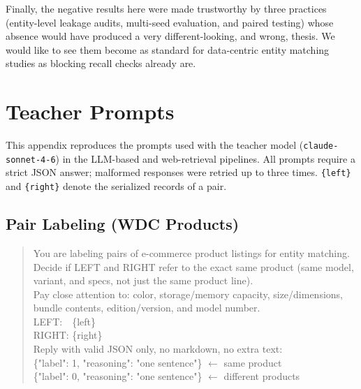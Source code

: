 \documentclass[a4paper,oneside,bibliography=totoc]{scrbook}
\begin{document}
Finally, the negative results here were made trustworthy by three practices (entity-level leakage audits, multi-seed evaluation, and paired testing) whose absence would have produced a very different-looking, and wrong, thesis. We would like to see them become as standard for data-centric entity matching studies as blocking recall checks already are.




\appendix

\chapter{Teacher Prompts}
\label{app:prompts}

{\sloppy This appendix reproduces the prompts used with the teacher model (\texttt{claude-sonnet-4-6}) in the LLM-based and web-retrieval pipelines. All prompts require a strict JSON answer; malformed responses were retried up to three times. \texttt{\{left\}} and \texttt{\{right\}} denote the serialized records of a pair.\par}

\section{Pair Labeling (WDC Products)}
\label{app:prompt_wdc}

\begin{quote}\small\ttfamily\raggedright
You are labeling pairs of e-commerce product listings for entity matching.\\
Decide if LEFT and RIGHT refer to the exact same product (same model, variant, and specs, not just the same product line).\\
Pay close attention to: color, storage/memory capacity, size/dimensions, bundle contents, edition/version, and model number.\\[4pt]
LEFT:\ \ \{left\}\\
RIGHT: \{right\}\\[4pt]
Reply with valid JSON only, no markdown, no extra text:\\
\{"label": 1, "reasoning": "one sentence"\} $\leftarrow$ same product\\
\{"label": 0, "reasoning": "one sentence"\} $\leftarrow$ different products
\end{quote}
\end{document}
